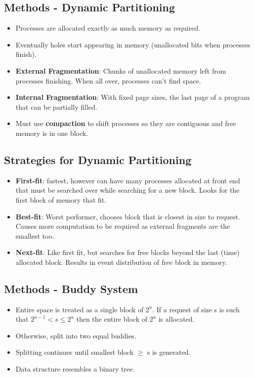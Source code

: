 \documentclass[fontsize=4.5pt]{scrartcl}
\begin{document}
\begin{multicols}{3}
        \subsection{Methods - Dynamic Partitioning}
        \begin{itemize}
          \item Processes are allocated exactly as much memory as required.
          \item Eventually holes start appearing in memory (unallocated bits when processes finish).
          \item \textbf{External Fragmentation}: Chunks of unallocated memory left from processes finishing. When all over, processes can't find space.
          \item \textbf{Internal Fragmentation}: With fixed page sizes, the last page of a program that can be partially filled.
          \item Must use \textbf{compaction} to shift processes so they are contiguous and free memory is in one block.
        \end{itemize}
        \subsection{Strategies for Dynamic Partitioning}
        \begin{itemize}
          \item \textbf{First-fit}: fastest, however can have many processes allocated at front end that must be searched over
                while searching for a new block. Looks for the first block of memory that fit.
          \item \textbf{Best-fit}: Worst performer, chooses block that is closest in size to request. Causes more computation to be
                required as external fragments are the smallest too.
          \item \textbf{Next-fit}: Like first fit, but searches for free blocks beyond the last (time) allocated block. Results in event distribution of free block
                in memory.
        \end{itemize}
        \subsection{Methods - Buddy System}
        \begin{itemize}
          \item Entire space is treated as a single block of $2^{u}$. If a request of size s is such that $2^{u-1}<s\leq2^{u}$ then
          the entire block of $2^{u}$ is allocated.
          \item Otherwise, split into two equal buddies.
          \item Splitting continues until smallest block $\geq$ s is generated.
          \item Data structure resembles a binary tree.
         \end{itemize}
    

\end{multicols}
\end{document}
